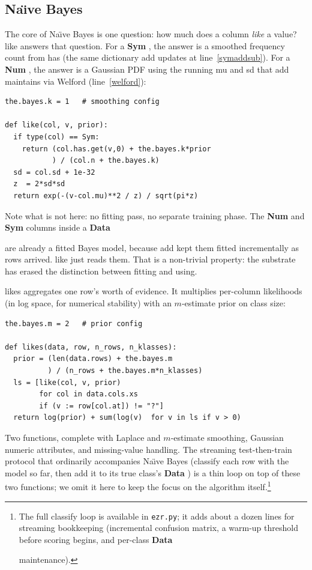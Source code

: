 \documentclass[AMA,STIX2COL]{WileyNJDv5}
\newcommand{\cls}[1]{%
  \setlength{\fboxsep}{1.5pt}%
  \colorbox{clsbg}{\sffamily\bfseries{#1}}%
}
\begin{document}
\subsection{Na\"{\i}ve Bayes}

The core of Na\"{\i}ve Bayes is one question: how much does a column
{\em like} a value? \textsf{like} answers that question. For a
\cls{Sym}, the answer is a smoothed frequency count from
\textsf{has} (the same dictionary \textsf{add} updates at
line~\ref{symaddsub}). For a \cls{Num}, the answer is a Gaussian
PDF using the running \textsf{mu} and \textsf{sd} that
\textsf{add} maintains via Welford (line~\ref{welford}):

\begin{lstlisting}
the.bayes.k = 1   # smoothing config

def like(col, v, prior):
  if type(col) == Sym:
    return (col.has.get(v,0) + the.bayes.k*prior
           ) / (col.n + the.bayes.k)
  sd = col.sd + 1e-32
  z  = 2*sd*sd
  return exp(-(v-col.mu)**2 / z) / sqrt(pi*z)
\end{lstlisting}
Note what is not here: no fitting pass, no separate training
phase. The \cls{Num} and \cls{Sym} columns inside a \cls{Data}
are already a fitted Bayes model, because \textsf{add} kept them
fitted incrementally as rows arrived. \textsf{like} just reads
them. That is a non-trivial property: the substrate has erased
the distinction between fitting and using.

\textsf{likes} aggregates one row's worth of evidence. It
multiplies per-column likelihoods (in log space, for numerical
stability) with an $m$-estimate prior on class size:

\begin{lstlisting}
the.bayes.m = 2   # prior config

def likes(data, row, n_rows, n_klasses):
  prior = (len(data.rows) + the.bayes.m
          ) / (n_rows + the.bayes.m*n_klasses)
  ls = [like(col, v, prior)
        for col in data.cols.xs
        if (v := row[col.at]) != "?"]
  return log(prior) + sum(log(v)  for v in ls if v > 0)
\end{lstlisting}
Two functions, complete with Laplace and $m$-estimate smoothing,
Gaussian numeric attributes, and missing-value handling. The
streaming test-then-train protocol that ordinarily accompanies
Na\"{\i}ve Bayes (classify each row with the model so far, then add
it to its true class's \cls{Data}) is a thin loop on top of
these two functions; we omit it here to keep the focus on the
algorithm itself.\footnote{The full \textsf{classify} loop is
available in \texttt{ezr.py}; it adds about a dozen lines for
streaming bookkeeping (incremental confusion matrix, a warm-up
threshold before scoring begins, and per-class \cls{Data}
maintenance).}
\end{document}
